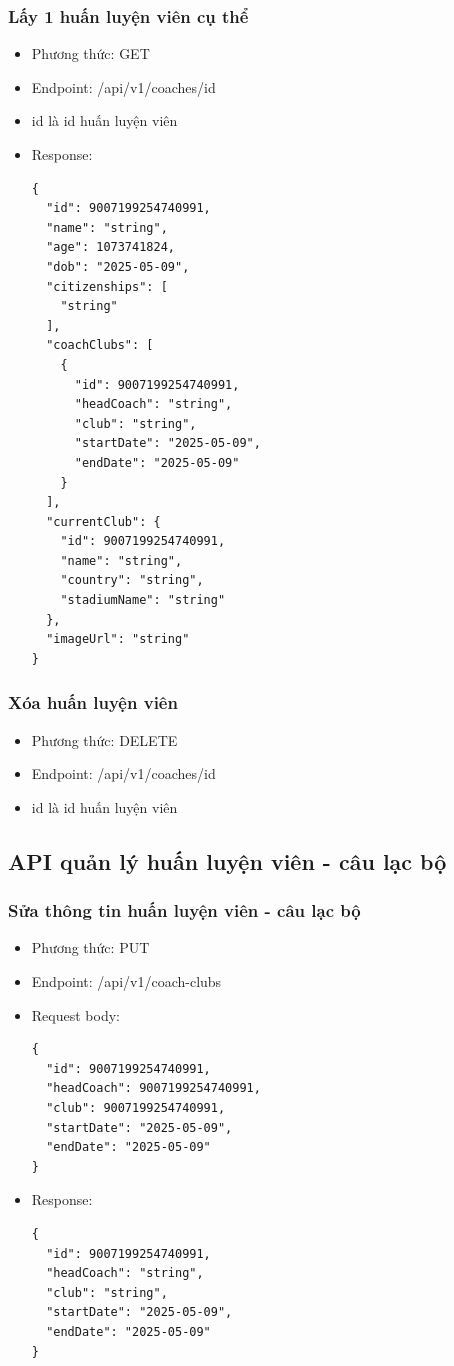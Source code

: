 \documentclass[../BTL.tex]{subfiles}
\begin{document}
\subsubsection{ Lấy 1 huấn luyện viên cụ thể}
\begin{itemize}
    \item Phương thức: GET
    \item Endpoint: /api/v1/coaches/{id}
    \item {id} là id huấn luyện viên
    \item Response:
        \begin{verbatim}
{
  "id": 9007199254740991,
  "name": "string",
  "age": 1073741824,
  "dob": "2025-05-09",
  "citizenships": [
    "string"
  ],
  "coachClubs": [
    {
      "id": 9007199254740991,
      "headCoach": "string",
      "club": "string",
      "startDate": "2025-05-09",
      "endDate": "2025-05-09"
    }
  ],
  "currentClub": {
    "id": 9007199254740991,
    "name": "string",
    "country": "string",
    "stadiumName": "string"
  },
  "imageUrl": "string"
}
        \end{verbatim}
\end{itemize}

\subsubsection{ Xóa huấn luyện viên}
\begin{itemize}
    \item Phương thức: DELETE
    \item Endpoint: /api/v1/coaches/{id}
    \item {id} là id huấn luyện viên
\end{itemize}

\subsection{ API quản lý huấn luyện viên - câu lạc bộ}
\subsubsection{ Sửa thông tin huấn luyện viên - câu lạc bộ}
\begin{itemize}
    \item Phương thức: PUT
    \item Endpoint: /api/v1/coach-clubs
    \item Request body:
        \begin{verbatim}
{
  "id": 9007199254740991,
  "headCoach": 9007199254740991,
  "club": 9007199254740991,
  "startDate": "2025-05-09",
  "endDate": "2025-05-09"
}
        \end{verbatim}
    \item Response:
        \begin{verbatim}
{
  "id": 9007199254740991,
  "headCoach": "string",
  "club": "string",
  "startDate": "2025-05-09",
  "endDate": "2025-05-09"
}
        \end{verbatim}
\end{itemize}
\end{document}
